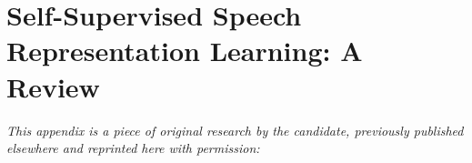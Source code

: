 
\chapter[self"=supervised speech representation learning: a review]{Self-Supervised Speech Representation Learning: A Review}
\label{app:paper-review}

\textit{This appendix is a piece of original research by the candidate, previously published elsewhere and reprinted here with permission:} \newline
\begin{center}
    \begin{enumerate}[leftmargin=8mm,rightmargin=8mm,topsep=0mm,label={[\Alph*]}]
        \setcounter{enumi}{6}
        \item {} \shared \hspace{0.1em} \parencite{mohamed_selfsupervised_2022}
        \end{enumerate}
\end{center}

